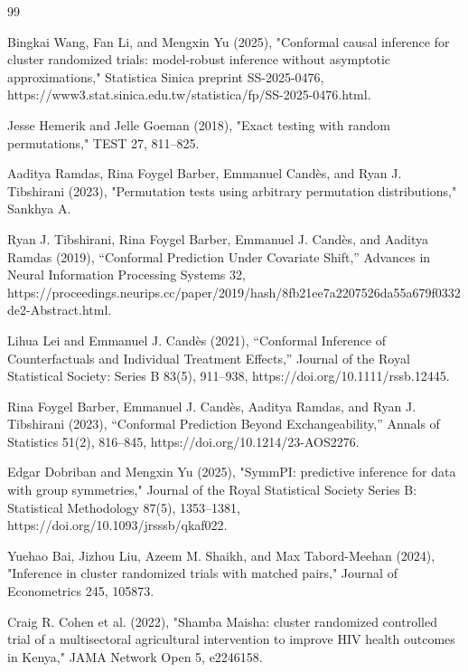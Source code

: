 \documentclass{article}
\begin{document}
\begin{thebibliography}{99}

   Bingkai Wang, Fan Li, and Mengxin Yu (2025), "Conformal causal inference for cluster randomized trials: model-robust inference without asymptotic approximations," Statistica Sinica preprint SS-2025-0476, https://www3.stat.sinica.edu.tw/statistica/fp/SS-2025-0476.html.

   Jesse Hemerik and Jelle Goeman (2018), "Exact testing with random permutations," TEST 27, 811--825.

   Aaditya Ramdas, Rina Foygel Barber, Emmanuel Candès, and Ryan J. Tibshirani (2023), "Permutation tests using arbitrary permutation distributions," Sankhya A.

   Ryan J. Tibshirani, Rina Foygel Barber, Emmanuel J. Candès, and Aaditya Ramdas (2019), ``Conformal Prediction Under Covariate Shift,'' Advances in Neural Information Processing Systems 32, https://proceedings.neurips.cc/paper/2019/hash/8fb21ee7a2207526da55a679f0332de2-Abstract.html.

   Lihua Lei and Emmanuel J. Candès (2021), ``Conformal Inference of Counterfactuals and Individual Treatment Effects,'' Journal of the Royal Statistical Society: Series B 83(5), 911--938, https://doi.org/10.1111/rssb.12445.

   Rina Foygel Barber, Emmanuel J. Candès, Aaditya Ramdas, and Ryan J. Tibshirani (2023), ``Conformal Prediction Beyond Exchangeability,'' Annals of Statistics 51(2), 816--845, https://doi.org/10.1214/23-AOS2276.

   Edgar Dobriban and Mengxin Yu (2025), "SymmPI: predictive inference for data with group symmetries," Journal of the Royal Statistical Society Series B: Statistical Methodology 87(5), 1353--1381, https://doi.org/10.1093/jrsssb/qkaf022.

   Yuehao Bai, Jizhou Liu, Azeem M. Shaikh, and Max Tabord-Meehan (2024), "Inference in cluster randomized trials with matched pairs," Journal of Econometrics 245, 105873.

   Craig R. Cohen et al. (2022), "Shamba Maisha: cluster randomized controlled trial of a multisectoral agricultural intervention to improve HIV health outcomes in Kenya," JAMA Network Open 5, e2246158.


\end{thebibliography}
\end{document}

